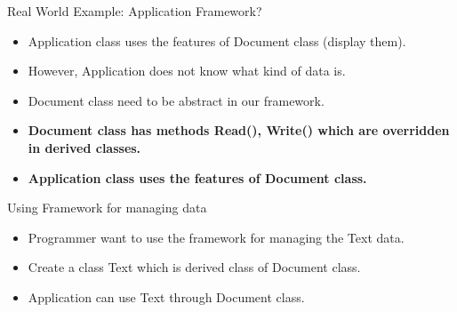 \documentclass[13pt]{beamer}
\begin{document}
\begin{frame}{Real World Example: Application Framework?}
\begin{itemize}
	\setlength\itemsep{1em}
	\item Application class uses the features of Document class (display them).
	\item However, Application does not know what kind of data is.
	\item Document class need to be abstract in our framework.
	\item \textbf{Document class has methods Read(), Write() which are overridden in derived classes.}
	\item \textbf{Application class uses the features of Document class.}
\end{itemize}
\begin{center}
\end{center}
\end{frame}

\begin{frame}{Using Framework for managing data}
\begin{itemize}
	\setlength\itemsep{1em}
	\item Programmer want to use the framework for managing the Text data.
	\item Create a class Text which is derived class of Document class.
	\item Application can use Text through Document class.
\end{itemize}
\begin{center}
\end{center}
\end{frame}
\end{document}
